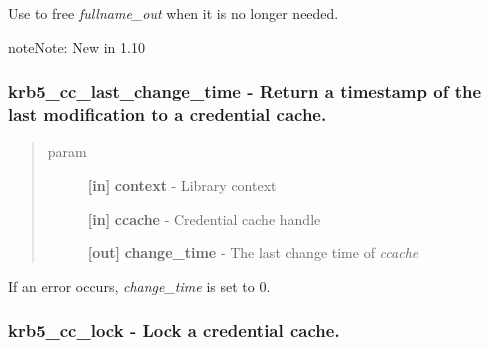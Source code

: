 \documentclass[letterpaper,10pt,english]{sphinxmanual}
\begin{document}
Use {\hyperref[appdev/refs/api/krb5_free_string:c.krb5_free_string]{}} to free \emph{fullname\_out} when it is no longer needed.

\begin{notice}{note}{Note:}
New in 1.10
\end{notice}


\subsubsection{krb5\_cc\_last\_change\_time -  Return a timestamp of the last modification to a credential cache.}
\label{appdev/refs/api/krb5_cc_last_change_time:krb5-cc-last-change-time-return-a-timestamp-of-the-last-modification-to-a-credential-cache}\label{appdev/refs/api/krb5_cc_last_change_time::doc}

\begin{fulllineitems}
\label{appdev/refs/api/krb5_cc_last_change_time:c.krb5_cc_last_change_time}
\end{fulllineitems}

\begin{quote}\begin{description}
\item[{param}] \leavevmode
\textbf{{[}in{]}} \textbf{context} - Library context

\textbf{{[}in{]}} \textbf{ccache} - Credential cache handle

\textbf{{[}out{]}} \textbf{change\_time} - The last change time of \emph{ccache}

\end{description}\end{quote}

If an error occurs, \emph{change\_time} is set to 0.


\subsubsection{krb5\_cc\_lock -  Lock a credential cache.}
\label{appdev/refs/api/krb5_cc_lock:krb5-cc-lock-lock-a-credential-cache}\label{appdev/refs/api/krb5_cc_lock::doc}
\end{document}
